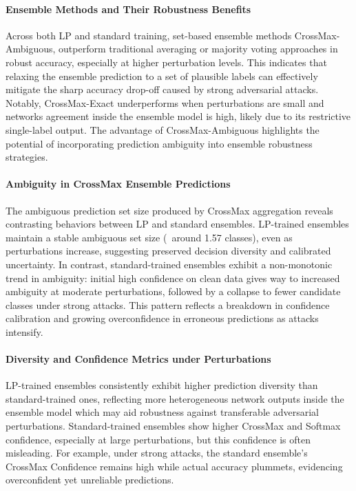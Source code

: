 \paragraph{Ensemble Methods and Their Robustness Benefits}

Across both LP and standard training, set-based ensemble methods CrossMax-Ambiguous, outperform traditional averaging or majority voting approaches in robust accuracy, especially at higher perturbation levels. This indicates that relaxing the ensemble prediction to a set of plausible labels can effectively mitigate the sharp accuracy drop-off caused by strong adversarial attacks. Notably, CrossMax-Exact underperforms when perturbations are small and networks agreement inside the ensemble model is high, likely due to its restrictive single-label output. The advantage of CrossMax-Ambiguous highlights the potential of incorporating prediction ambiguity into ensemble robustness strategies.

\paragraph{Ambiguity in CrossMax Ensemble Predictions}

The ambiguous prediction set size produced by CrossMax aggregation reveals contrasting behaviors between LP and standard ensembles. LP-trained ensembles maintain a stable ambiguous set size (~around 1.57 classes), even as perturbations increase, suggesting preserved decision diversity and calibrated uncertainty. In contrast, standard-trained ensembles exhibit a non-monotonic trend in ambiguity: initial high confidence on clean data gives way to increased ambiguity at moderate perturbations, followed by a collapse to fewer candidate classes under strong attacks. This pattern reflects a breakdown in confidence calibration and growing overconfidence in erroneous predictions as attacks intensify.

\paragraph{Diversity and Confidence Metrics under Perturbations}

LP-trained ensembles consistently exhibit higher prediction diversity than standard-trained ones, reflecting more heterogeneous network outputs inside the ensemble model which may aid robustness against transferable adversarial perturbations. Standard-trained ensembles show higher CrossMax and Softmax confidence, especially at large perturbations, but this confidence is often misleading. For example, under strong attacks, the standard ensemble's CrossMax Confidence remains high while actual accuracy plummets, evidencing overconfident yet unreliable predictions.

